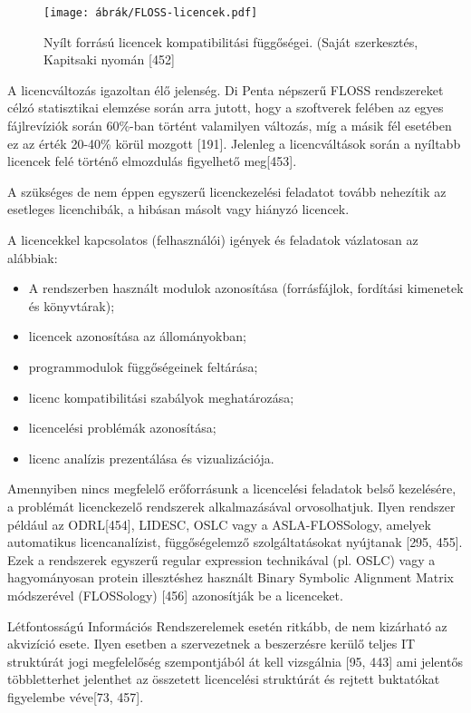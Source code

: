 \documentclass[12pt,magyar,a4paper,oneside]{scrreprt}
\providecommand{\tightlist}{%
  \setlength{\itemsep}{0pt}\setlength{\parskip}{0pt}}
\begin{document}
\begin{figure}
\hypertarget{fig:licencDeps}{%
\centering
\texttt{[image: ábrák/FLOSS-licencek.pdf]}
\caption{Nyílt forrású licencek kompatibilitási függőségei. (Saját
szerkesztés, Kapitsaki nyomán {[}452{]}}\label{fig:licencDeps}
}
\end{figure}

A licencváltozás igazoltan élő jelenség. Di Penta népszerű FLOSS
rendszereket célzó statisztikai elemzése során arra jutott, hogy a
szoftverek felében az egyes fájlrevíziók során 60\%-ban történt
valamilyen változás, míg a másik fél esetében ez az érték 20-40\% körül
mozgott {[}191{]}. Jelenleg a licencváltások során a nyíltabb licencek
felé történő elmozdulás figyelhető meg{[}453{]}.

A szükséges de nem éppen egyszerű licenckezelési feladatot tovább
nehezítik az esetleges licenchibák, a hibásan másolt vagy hiányzó
licencek.

A licencekkel kapcsolatos (felhasználói) igények és feladatok vázlatosan
az alábbiak:

\begin{itemize}
\tightlist
\item
  A rendszerben használt modulok azonosítása (forrásfájlok, fordítási
  kimenetek és könyvtárak);
\item
  licencek azonosítása az állományokban;
\item
  programmodulok függőségeinek feltárása;
\item
  licenc kompatibilitási szabályok meghatározása;
\item
  licencelési problémák azonosítása;
\item
  licenc analízis prezentálása és vizualizációja.
\end{itemize}

Amennyiben nincs megfelelő erőforrásunk a licencelési feladatok belső
kezelésére, a problémát licenckezelő rendszerek alkalmazásával
orvosolhatjuk. Ilyen rendszer például az ODRL{[}454{]}, LIDESC, OSLC
vagy a ASLA-FLOSSology, amelyek automatikus licencanalízist,
függőségelemző szolgáltatásokat nyújtanak {[}295, 455{]}. Ezek a
rendszerek egyszerű regular expression technikával (pl. OSLC) vagy a
hagyományosan protein illesztéshez használt Binary Symbolic Alignment
Matrix módszerével (FLOSSology) {[}456{]} azonosítják be a licenceket.

Létfontosságú Információs Rendszerelemek esetén ritkább, de nem
kizárható az akvizíció esete. Ilyen esetben a szervezetnek a beszerzésre
kerülő teljes IT struktúrát jogi megfelelőség szempontjából át kell
vizsgálnia {[}95, 443{]} ami jelentős többletterhet jelenthet az
összetett licencelési struktúrát és rejtett buktatókat figyelembe
véve{[}73, 457{]}.
\end{document}
